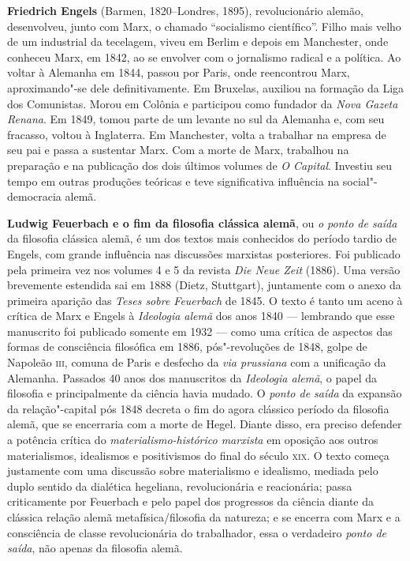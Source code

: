\textbf{Friedrich Engels} (Barmen, 1820--Londres, 1895), revolucionário alemão,
desenvolveu, junto com Marx, o chamado ``socialismo científico''. Filho mais velho
de um industrial da tecelagem, viveu em Berlim e depois em Manchester, onde
conheceu Marx, em 1842, ao se envolver com o jornalismo radical e a política.
Ao voltar à Alemanha em 1844, passou por Paris, onde reencontrou Marx,
aproximando"-se dele definitivamente. Em Bruxelas, auxiliou na formação da Liga
dos Comunistas. Morou em Colônia e participou como fundador da \textit{Nova
Gazeta Renana}. Em 1849, tomou parte de um levante no sul da Alemanha e, com seu
fracasso, voltou à Inglaterra. Em Manchester, volta a trabalhar na empresa de
seu pai e passa a sustentar Marx. 
Com a morte de Marx, trabalhou na preparação e na publicação dos dois últimos
volumes de \textit{O Capital}. Investiu seu tempo em outras produções teóricas e
teve significativa influência na social"-democracia alemã.

\textbf{Ludwig Feuerbach e o fim da filosofia clássica alemã}, ou \emph{o
ponto de saída} da filosofia clássica alemã, é um dos textos mais
conhecidos do período tardio de Engels, com grande influência nas
discussões marxistas posteriores. Foi publicado
pela primeira vez nos volumes 4 e 5 da revista
\emph{Die Neue Zeit} (1886). Uma versão brevemente estendida sai em 1888 (Dietz, Stuttgart), juntamente com o anexo da primeira
aparição das \emph{Teses sobre Feuerbach} de 1845. O texto é tanto um aceno à crítica de Marx e Engels à
\emph{Ideologia alemã} dos anos 1840 --- lembrando que esse manuscrito
foi publicado somente
em 1932 --- como uma crítica de aspectos das formas de consciência
filosófica em 1886, pós"-revoluções de 1848, golpe de Napoleão \textsc{iii},
comuna de Paris e desfecho da \emph{via prussiana} com a unificação da
Alemanha. Passados 40 anos dos manuscritos da \emph{Ideologia alemã}, o
papel da filosofia e principalmente da ciência havia mudado. O
\emph{ponto de saída} da expansão da relação"-capital pós 1848 decreta o
fim do agora clássico período da filosofia alemã, que se encerraria com a
morte de Hegel. Diante disso, era preciso defender a potência
crítica do \emph{materialismo-histórico marxista} em oposição aos outros
materialismos, idealismos e positivismos do final do século \textsc{xix}. O texto
começa justamente com uma discussão sobre materialismo e idealismo,
mediada pelo duplo sentido da dialética hegeliana,
revolucionária e reacionária; passa criticamente por Feuerbach e pelo
papel dos progressos da ciência diante da clássica relação alemã
metafísica/filosofia da natureza; e se encerra com Marx e a
consciência de classe revolucionária do trabalhador, essa o verdadeiro
\emph{ponto de saída}, não apenas da filosofia alemã.
        
